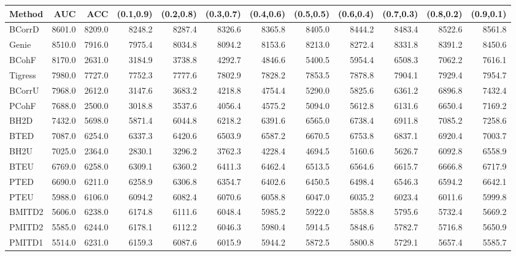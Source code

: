 \begin{table}[ht]
\centering
\begin{tabular}{lrrrrrrrrrrr}
  \hline
Method & AUC & ACC & (0.1,0.9) & (0.2,0.8) & (0.3,0.7) & (0.4,0.6) & (0.5,0.5) & (0.6,0.4) & (0.7,0.3) & (0.8,0.2) & (0.9,0.1) \\ 
  \hline
BCorrD & 8601.0 & 8209.0 & 8248.2 & 8287.4 & 8326.6 & 8365.8 & 8405.0 & 8444.2 & 8483.4 & 8522.6 & 8561.8 \\ 
  Genie & 8510.0 & 7916.0 & 7975.4 & 8034.8 & 8094.2 & 8153.6 & 8213.0 & 8272.4 & 8331.8 & 8391.2 & 8450.6 \\ 
  BCohF & 8170.0 & 2631.0 & 3184.9 & 3738.8 & 4292.7 & 4846.6 & 5400.5 & 5954.4 & 6508.3 & 7062.2 & 7616.1 \\ 
  Tigress & 7980.0 & 7727.0 & 7752.3 & 7777.6 & 7802.9 & 7828.2 & 7853.5 & 7878.8 & 7904.1 & 7929.4 & 7954.7 \\ 
  BCorrU & 7968.0 & 2612.0 & 3147.6 & 3683.2 & 4218.8 & 4754.4 & 5290.0 & 5825.6 & 6361.2 & 6896.8 & 7432.4 \\ 
  PCohF & 7688.0 & 2500.0 & 3018.8 & 3537.6 & 4056.4 & 4575.2 & 5094.0 & 5612.8 & 6131.6 & 6650.4 & 7169.2 \\ 
  BH2D & 7432.0 & 5698.0 & 5871.4 & 6044.8 & 6218.2 & 6391.6 & 6565.0 & 6738.4 & 6911.8 & 7085.2 & 7258.6 \\ 
  BTED & 7087.0 & 6254.0 & 6337.3 & 6420.6 & 6503.9 & 6587.2 & 6670.5 & 6753.8 & 6837.1 & 6920.4 & 7003.7 \\ 
  BH2U & 7025.0 & 2364.0 & 2830.1 & 3296.2 & 3762.3 & 4228.4 & 4694.5 & 5160.6 & 5626.7 & 6092.8 & 6558.9 \\ 
  BTEU & 6769.0 & 6258.0 & 6309.1 & 6360.2 & 6411.3 & 6462.4 & 6513.5 & 6564.6 & 6615.7 & 6666.8 & 6717.9 \\ 
  PTED & 6690.0 & 6211.0 & 6258.9 & 6306.8 & 6354.7 & 6402.6 & 6450.5 & 6498.4 & 6546.3 & 6594.2 & 6642.1 \\ 
  PTEU & 5988.0 & 6106.0 & 6094.2 & 6082.4 & 6070.6 & 6058.8 & 6047.0 & 6035.2 & 6023.4 & 6011.6 & 5999.8 \\ 
  BMITD2 & 5606.0 & 6238.0 & 6174.8 & 6111.6 & 6048.4 & 5985.2 & 5922.0 & 5858.8 & 5795.6 & 5732.4 & 5669.2 \\ 
  PMITD2 & 5585.0 & 6244.0 & 6178.1 & 6112.2 & 6046.3 & 5980.4 & 5914.5 & 5848.6 & 5782.7 & 5716.8 & 5650.9 \\ 
  PMITD1 & 5514.0 & 6231.0 & 6159.3 & 6087.6 & 6015.9 & 5944.2 & 5872.5 & 5800.8 & 5729.1 & 5657.4 & 5585.7 \\ 

\end{tabular}
\end{table}
